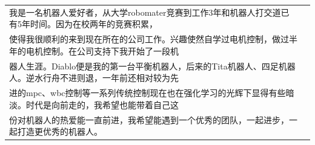 
\begin{tabular}{ll} 
 \\ \qquad 我是一名机器人爱好者，从大学robomater竞赛到工作3年和机器人打交道已有5年时间。因为在校两年的竞赛积累，\\
    使得我很顺利的来到现在所在的公司工作。兴趣使然自学过电机控制，做过半年的电机控制。在公司支持下我开始了一段机\\
    器人生涯。Diablo便是我的第一台平衡机器人，后来的Tita机器人、四足机器人。逆水行舟不进则退，一年前还相对较为先\\
    进的mpc、wbc控制等一系列传统控制现在也在强化学习的光辉下显得有些暗淡。时代是向前走的，我希望也能带着自己这\\
    份对机器人的热爱能一直前进，我希望能遇到一个优秀的团队，一起进步，一起打造更优秀的机器人。
\end{tabular}

